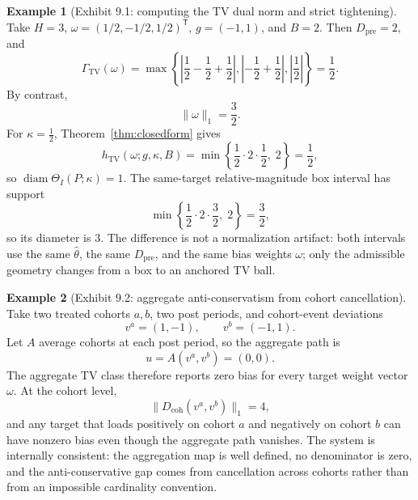 \documentclass[11pt]{article}
\newcommand{\transpose}{\mathsf{T}}
\theoremstyle{definition}
\newtheorem{example}{Example}
\theoremstyle{plain}
\theoremstyle{remark}
\begin{document}
\begin{example}[Exhibit 9.1: computing the TV dual norm and strict tightening]\label{ex:gamma}
Take \(H=3\), \(\omega=(1/2,-1/2,1/2)^\transpose\), \(g=(-1,1)\), and \(B=2\). Then \(D_{\mathrm{pre}}=2\), and
\[
\Gamma_{\mathrm{TV}}(\omega)
=
\max\left\{
\left|\frac12-\frac12+\frac12\right|,
\left|-\frac12+\frac12\right|,
\left|\frac12\right|
\right\}
=\frac12.
\]
By contrast,
\[
\|\omega\|_1=\frac32.
\]
For \(\kappa=\frac12\), Theorem~\ref{thm:closedform} gives
\[
h_{\mathrm{TV}}(\omega;g,\kappa,B)
=
\min\left\{\frac12\cdot 2\cdot \frac12,\;2\right\}
=\frac12,
\]
so \(\operatorname{diam}\Theta_I(P;\kappa)=1\). The same-target relative-magnitude box interval has support
\[
\min\left\{\frac12\cdot 2\cdot \frac32,\;2\right\}
=\frac32,
\]
so its diameter is \(3\). The difference is not a normalization artifact: both intervals use the same \(\hat\theta\), the same \(D_{\mathrm{pre}}\), and the same bias weights \(\omega\); only the admissible geometry changes from a box to an anchored TV ball.
\end{example}

\begin{example}[Exhibit 9.2: aggregate anti-conservatism from cohort cancellation]\label{ex:projection}
Take two treated cohorts \(a,b\), two post periods, and cohort-event deviations
\[
v^a=(1,-1),\qquad v^b=(-1,1).
\]
Let \(A\) average cohorts at each post period, so the aggregate path is
\[
u=A(v^a,v^b)=(0,0).
\]
The aggregate TV class therefore reports zero bias for every target weight vector \(\omega\). At the cohort level,
\[
\|D_{\mathrm{coh}}(v^a,v^b)\|_1=4,
\]
and any target that loads positively on cohort \(a\) and negatively on cohort \(b\) can have nonzero bias even though the aggregate path vanishes. The system is internally consistent: the aggregation map is well defined, no denominator is zero, and the anti-conservative gap comes from cancellation across cohorts rather than from an impossible cardinality convention.
\end{example}
\end{document}

